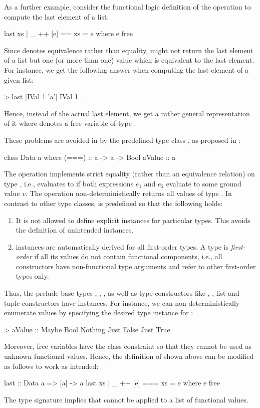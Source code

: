 As a further example, consider the functional logic definition
of the operation  to compute the last element of a list:
%
\begin{curry}
last xs | _ ++ [e] == xs = e
  where e free
\end{curry}
%
Since \ccode{==} denotes equivalence rather than equality,
 might not return the last element of a list
but one (or more than one) value which is equivalent to the
last element.
For instance, we get the following answer when computing the last element
of a given  list:
%
\begin{curry}
> last [IVal 1 'a']
IVal 1 _
\end{curry}
%
Hence, instead of the actual last element, we get a rather general
representation of it where \ccode{\us} denotes a free variable
of type .

These problems are avoided in \CYS by the predefined type class ,
as proposed in \cite{HanusTeegen20}:
%
\begin{curry}
class Data a where
  (===)  :: a -> a -> Bool
  aValue :: a
\end{curry}
%
The operation \ccode{===} implements strict equality
(rather than an equivalence relation) on type ,
i.e.,  evaluates to 
if both expressions $e_1$ and $e_2$ evaluate to some ground value $v$.
The operation  non-deterministically returns
all values of type .
In contrast to other type classes,  is predefined
so that the following holds:
%
\begin{enumerate}
\item
It is not allowed to define explicit  instances
for particular types. This avoids the definition of unintended instances.
\item
{} instances are automatically derived
for all first-order types.
A type is \emph{first-order} if all its values
do not contain functional components,
i.e., all constructors have non-functional type arguments and
refer to other first-order types only.
\end{enumerate}
%
Thus, the prelude base types , , ,
 as well as type constructors like
, , list and tuple constructors
have  instances.
For instance, we can non-deterministically enumerate values
by specifying the desired type instance for :
%
\begin{curry}
> aValue :: Maybe Bool
Nothing
Just False
Just True
\end{curry}
%
Moreover, free variables have the class constraint 
so that they cannot be used as unknown functional values.
Hence, the definition of  shown above
can be modified as follows to work as intended:
%
\begin{curry}
last :: Data a => [a] -> a
last xs | _ ++ [e] === xs = e
  where e free
\end{curry}
%
The type signature implies that  cannot be applied
to a list of functional values.


